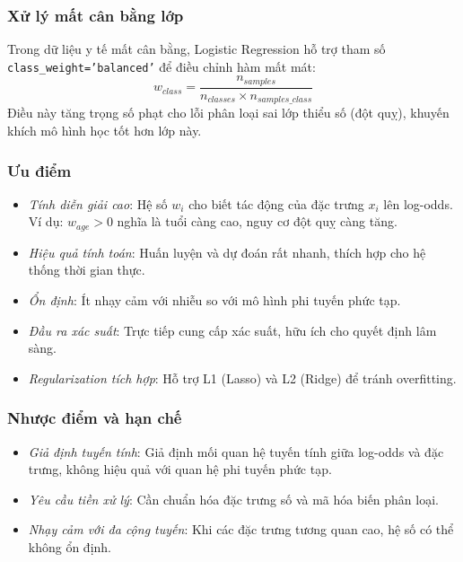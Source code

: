 ﻿\documentclass{article}
\begin{document}
\subsubsection*{Xử lý mất cân bằng lớp}
Trong dữ liệu y tế mất cân bằng, Logistic Regression hỗ trợ tham số \texttt{class\_weight='balanced'} để điều chỉnh hàm mất mát:
\begin{equation}
w_{class} = \frac{n_{samples}}{n_{classes} \times n_{samples\_class}}
\end{equation}
Điều này tăng trọng số phạt cho lỗi phân loại sai lớp thiểu số (đột quỵ), khuyến khích mô hình học tốt hơn lớp này.

\subsubsection*{Ưu điểm}
\begin{itemize}
    \item \textit{Tính diễn giải cao}: Hệ số $w_i$ cho biết tác động của đặc trưng $x_i$ lên log-odds. Ví dụ: $w_{age} > 0$ nghĩa là tuổi càng cao, nguy cơ đột quỵ càng tăng.
    \item \textit{Hiệu quả tính toán}: Huấn luyện và dự đoán rất nhanh, thích hợp cho hệ thống thời gian thực.
    \item \textit{Ổn định}: Ít nhạy cảm với nhiễu so với mô hình phi tuyến phức tạp.
    \item \textit{Đầu ra xác suất}: Trực tiếp cung cấp xác suất, hữu ích cho quyết định lâm sàng.
    \item \textit{Regularization tích hợp}: Hỗ trợ L1 (Lasso) và L2 (Ridge) để tránh overfitting.
\end{itemize}

\subsubsection*{Nhược điểm và hạn chế}
\begin{itemize}
    \item \textit{Giả định tuyến tính}: Giả định mối quan hệ tuyến tính giữa log-odds và đặc trưng, không hiệu quả với quan hệ phi tuyến phức tạp.
    \item \textit{Yêu cầu tiền xử lý}: Cần chuẩn hóa đặc trưng số và mã hóa biến phân loại.
    \item \textit{Nhạy cảm với đa cộng tuyến}: Khi các đặc trưng tương quan cao, hệ số có thể không ổn định.
\end{itemize}
\end{document}
